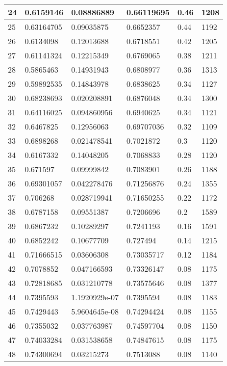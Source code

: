 \begin{longtable}{|l|l|l|l|l|l|}
24 & 0.6159146 & 0.08886889 & 0.66119695 & 0.46 & 1208 \\ \hline 
25 & 0.63164705 & 0.09035875 & 0.6652357 & 0.44 & 1192 \\ \hline 
26 & 0.6134098 & 0.12013688 & 0.6718551 & 0.42 & 1205 \\ \hline 
27 & 0.61141324 & 0.12215349 & 0.6769065 & 0.38 & 1211 \\ \hline 
28 & 0.5865463 & 0.14931943 & 0.6808977 & 0.36 & 1313 \\ \hline 
29 & 0.59892535 & 0.14843978 & 0.6838625 & 0.34 & 1127 \\ \hline 
30 & 0.68238693 & 0.020208891 & 0.6876048 & 0.34 & 1300 \\ \hline 
31 & 0.64116025 & 0.094860956 & 0.6940625 & 0.34 & 1121 \\ \hline 
32 & 0.6467825 & 0.12956063 & 0.69707036 & 0.32 & 1109 \\ \hline 
33 & 0.6898268 & 0.021478541 & 0.7021872 & 0.3 & 1120 \\ \hline 
34 & 0.6167332 & 0.14048205 & 0.7068833 & 0.28 & 1120 \\ \hline 
35 & 0.671597 & 0.09999842 & 0.7083901 & 0.26 & 1188 \\ \hline 
36 & 0.69301057 & 0.042278476 & 0.71256876 & 0.24 & 1355 \\ \hline 
37 & 0.706268 & 0.028719941 & 0.71650255 & 0.22 & 1172 \\ \hline 
38 & 0.6787158 & 0.09551387 & 0.7206696 & 0.2 & 1589 \\ \hline 
39 & 0.6867232 & 0.10289297 & 0.7241193 & 0.16 & 1591 \\ \hline 
40 & 0.6852242 & 0.10677709 & 0.727494 & 0.14 & 1215 \\ \hline 
41 & 0.71666515 & 0.03606308 & 0.73035717 & 0.12 & 1184 \\ \hline 
42 & 0.7078852 & 0.047166593 & 0.73326147 & 0.08 & 1175 \\ \hline 
43 & 0.72818685 & 0.031210778 & 0.73575646 & 0.08 & 1377 \\ \hline 
44 & 0.7395593 & 1.1920929e-07 & 0.7395594 & 0.08 & 1183 \\ \hline 
45 & 0.7429443 & 5.9604645e-08 & 0.74294424 & 0.08 & 1155 \\ \hline 
46 & 0.7355032 & 0.037763987 & 0.74597704 & 0.08 & 1150 \\ \hline 
47 & 0.74033284 & 0.031538658 & 0.74847615 & 0.08 & 1175 \\ \hline 
48 & 0.74300694 & 0.03215273 & 0.7513088 & 0.08 & 1140 \\ \hline 

\end{longtable}
